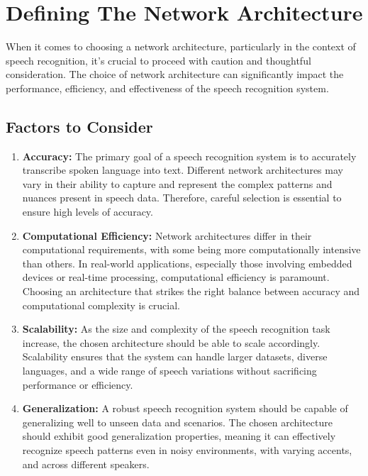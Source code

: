 \documentclass[a4paper]{report}
\begin{document}
{\section{Defining The Network Architecture}
When it comes to choosing a network architecture, particularly in the context of speech recognition, it's crucial to proceed with caution and thoughtful consideration. The choice of network architecture can significantly impact the performance, efficiency, and effectiveness of the speech recognition system.

\subsection{Factors to Consider}

\begin{enumerate}[label=\alph*)]
    \item \textbf{Accuracy:} The primary goal of a speech recognition system is to accurately transcribe spoken language into text. Different network architectures may vary in their ability to capture and represent the complex patterns and nuances present in speech data. Therefore, careful selection is essential to ensure high levels of accuracy.
    
    \item \textbf{Computational Efficiency:} Network architectures differ in their computational requirements, with some being more computationally intensive than others. In real-world applications, especially those involving embedded devices or real-time processing, computational efficiency is paramount. Choosing an architecture that strikes the right balance between accuracy and computational complexity is crucial.
    
    \item \textbf{Scalability:} As the size and complexity of the speech recognition task increase, the chosen architecture should be able to scale accordingly. Scalability ensures that the system can handle larger datasets, diverse languages, and a wide range of speech variations without sacrificing performance or efficiency.
    
    \item \textbf{Generalization:} A robust speech recognition system should be capable of generalizing well to unseen data and scenarios. The chosen architecture should exhibit good generalization properties, meaning it can effectively recognize speech patterns even in noisy environments, with varying accents, and across different speakers.
    

\end{enumerate}}
\end{document}

